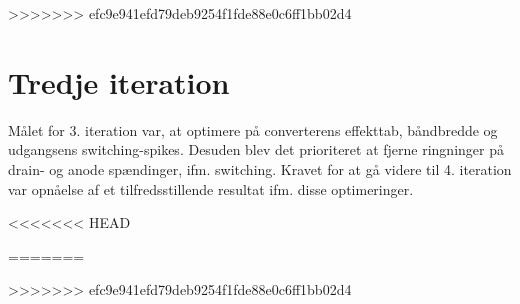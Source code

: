 >>>>>>> efc9e941efd79deb9254f1fde88e0c6ff1bb02d4

\section{Tredje iteration}
Målet for 3. iteration var, at optimere på converterens effekttab, båndbredde og udgangsens switching-spikes. Desuden blev det prioriteret at fjerne ringninger på drain- og anode spændinger, ifm. switching.
Kravet for at gå videre til 4. iteration var opnåelse af et tilfredsstillende resultat ifm. disse optimeringer.











<<<<<<< HEAD

=======

>>>>>>> efc9e941efd79deb9254f1fde88e0c6ff1bb02d4



	
	

